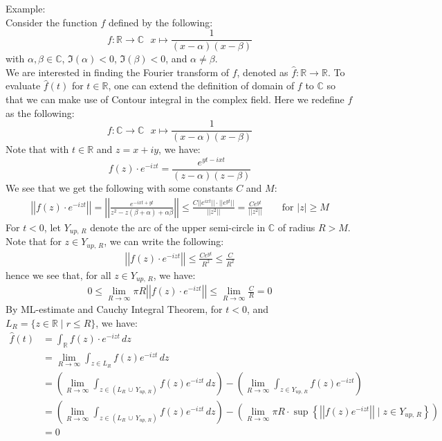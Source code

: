 \documentclass[11pt,oneside]{book}
\theoremstyle{break}
\theoremstyle{break}
\newcommand{\R}{\mathbb{R}}
\newcommand{\Complex}{\mathbb{C}}
\newcommand{\example}{\color{green}Example: \color{black}}
\begin{document}
\example\\
Consider the function $f$ defined by the following: 
$$f:\R \to \Complex \ \ \ x\mapsto \frac{1}{(x-\alpha) (x-\beta)}$$ 
with $\alpha,\beta \in \Complex$, $\Im(\alpha)<0$, $\Im(\beta)<0$, and $\alpha \neq \beta$. \\
We are interested in finding the Fourier transform of $f$, denoted as $\hat{f}:\R \to \R$. To evaluate $\hat{f}(t)$ for $t \in \R$, one can extend the definition of domain of $f$ to $\Complex$ so that we can make use of Contour integral in the complex field. Here we redefine $f$ as the following: 
$$f:\Complex \to \Complex \ \ \ x\mapsto \frac{1}{(x-\alpha) (x-\beta)}$$
Note that with $t \in \R$ and $z =x+iy$, we have: 
$$f(z)\cdot e^{-iz t} = \frac{e^{yt - ixt}}{(z-\alpha)(z-\beta)} $$
We see that we get the following with some constants $C$ and $M$:
\begin{align*}
\left|\left|f(z)\cdot e^{-iz t} \right|\right|  = \left|\left| \frac{e^{-ixt+yt}}{z^2 -z(\beta+\alpha)+\alpha\beta} \right|\right| \leq \frac{C||e^{ixt}||\cdot  ||e^{yt}||}{||z^2||} = \frac{Ce^{yt}}{||z^2||} \qquad \text{for }|z| \geq M
\end{align*}
For $t<0$, let $Y_{up,\,R}$ denote the arc of the upper semi-circle in $\Complex$ of radius $R>M$. \\
Note that for $z \in Y_{up,\,R}$, we can write the following:
\begin{align*}
\left|\left|f(z) \cdot e^{-iz t} \right|\right| \leq \frac{Ce^{yt}}{R^2} \leq \frac{C}{R^2}
\end{align*}
hence we see that, for all $z \in Y_{up,\, R}$, we have:
\begin{align*}
0\leq \lim_{R\to \infty} \pi R\left|\left|f(z)\cdot e^{-iz t} \right|\right| \leq \lim_{R\to \infty} \frac{C}{R} = 0
\end{align*}
By ML-estimate and Cauchy Integral Theorem, for $t<0$, and $L_R = \{z \in \R \mid r\leq R\}$, we have:
\begin{align*}
\hat{f}(t) 
&= \int_{\R} f(z)\cdot e^{-iz t}\, dz \\
&= \lim_{R\to \infty} \int_{z \in L_R} f(z) e^{-iz t}\, dz\\
&= \left( \lim_{R\to \infty}\int_{z \in (L_R\,\cup\, Y_{up,\,R})} f(z) e^{-iz t}\, dz\right)-\left( \lim_{R\to \infty}\int_{z \in  Y_{up,\,R}} f(z) e^{-iz t}\right)\\
&= \left( \lim_{R\to \infty}\int_{z \in (L_R\,\cup\, Y_{up,\,R})} f(z) e^{-iz t}\, dz \right) - \left(\lim_{R\to \infty} \pi R \cdot \sup\left\{ \left|\left|f(z) e^{-iz t} \right|\right| \mid {z \in  Y_{up,\,R}}\right\}\right)\\
&= 0
\end{align*}
\end{document}

